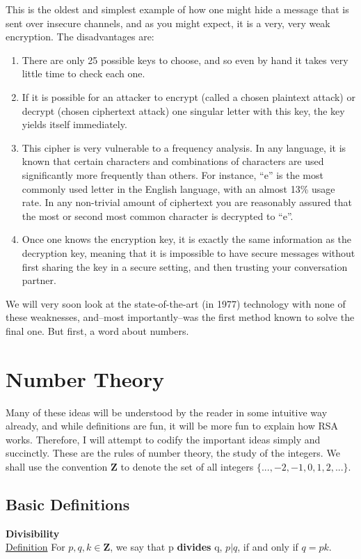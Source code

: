 \documentclass{article}
\begin{document}
        This is the oldest and simplest example of how one might hide a message that is sent over insecure channels, and as you might expect, it is a very, very weak encryption.
        The disadvantages are:
        \begin{enumerate}
            \item
            There are only 25 possible keys to choose, and so even by hand it takes very little time to check each one.
            \item
            If it is possible for an attacker to encrypt (called a chosen plaintext attack) or decrypt (chosen ciphertext attack) one singular letter with this key, the key yields itself immediately.
            \item
            This cipher is very vulnerable to a frequency analysis.  In any language, it is known that certain characters and combinations of characters are used significantly more frequently than others.  For instance, ``e'' is the most commonly used letter in the English language, with an almost 13\% usage rate.  In any non-trivial amount of ciphertext you are reasonably assured that the most or second most common character is decrypted to ``e''.
            \item
            Once one knows the encryption key, it is exactly the same information as the decryption key, meaning that it is impossible to have secure messages without first sharing the key in a secure setting, and then trusting your conversation partner.  
        \end{enumerate}
        
        We will very soon look at the state-of-the-art (in 1977) technology with none of these weaknesses, and--most importantly--was the first method known to solve the final one.  
        But first, a word about numbers.
        
    \section{Number Theory}
        Many of these ideas will be understood by the reader in some intuitive way already, and while definitions are fun, it will be more fun to explain how RSA works.
        Therefore, I will attempt to codify the important ideas simply and succinctly.  
        These are the rules of number theory, the study of the integers.  We shall use the convention $\mathbf{Z}$ to denote the set of all integers $\{...,-2,-1,0,1,2,...\}$.
        
        \subsection{Basic Definitions}
            \textbf{Divisibility}\\
            \underline{Definition} For $p, q, k \in\mathbf{Z}$, we say that p \textbf{divides} q, $p|q$, if and only if $q=pk$.
            
\end{document}
